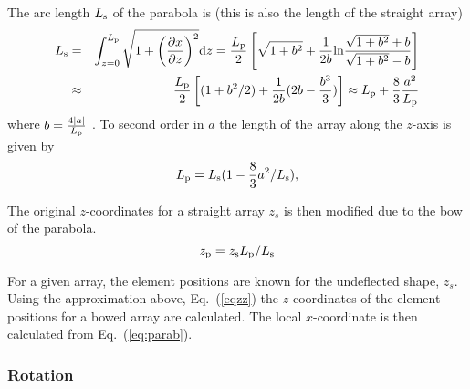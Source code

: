 \documentclass{saclantc}
\begin{document}
The arc length $L_{\rm s}$ of the
parabola is (this is also the length of the straight array)
\begin{eqnarray}
L_{\rm s} &=& \int_{z=0}^{L_{\rm p}} \sqrt{ 1+\left( \frac{\partial
 x}{\partial z}\right)^2} {\rm d} z=
 \frac{L_{\rm p}}{2}\left[\sqrt{1+b^2}+
 \frac{1}{2b}{\rm ln} \frac{\sqrt{1+b^2}+b}{\sqrt{1+b^2}-b}\right]
\nonumber \\ 
&\approx&  \frac{L_{\rm p}}{2}\left[ (1+b^2/2) +
 \frac{1}{2b}(2b-\frac{b^3}{3})\right]
\approx L_{\rm p}+\frac{8}{3}\frac{a^2}{L_{\rm p}}
\end{eqnarray}
where $b=\frac{4 |a|}{L_{\rm p}}$ .
To second order in $a$ the length of the array along the $z$-axis is given by
\begin{equation}
L_{\rm p}= L_{\rm s} ( 1-\frac{8}{3} a^2/L_{\rm s}),
\end{equation}


The original $z$-coordinates for a straight array $z_s$ is then modified
due to the bow of the parabola.
\begin{equation}
z_{\rm p}=z_{\rm s} L_{\rm p}/L_{\rm s}
\label{eqzz}
\end{equation}

For a given array, the element positions are known for the undeflected
shape, $z_s$. 
Using the approximation above, Eq.~(\ref{eqzz}) the $z$-coordinates of
the element positions for a bowed array are calculated. 
The local $x$-coordinate is then calculated from Eq.~(\ref{eq:parab}).


\subsubsection{Rotation}
\end{document}
